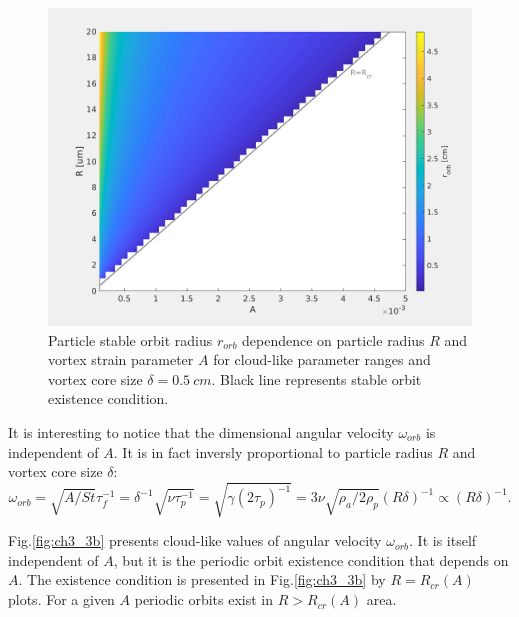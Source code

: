 \documentclass[../main.tex]{subfiles}
\begin{document}
\begin{figure}
\centering
\noindent \includegraphics[width=30pc]{gfx/orbit_vs_R_A_delta05cm.png}
\caption{Particle stable orbit radius $r_{orb}$ dependence on  particle radius $R$ and vortex strain parameter $A$ for cloud-like parameter ranges and vortex core size $\delta=0.5~cm$. Black line represents stable orbit existence condition.}
\label{fig:ch3_3a}
\end{figure}

It is interesting to notice that the dimensional angular velocity $\omega_{orb}$ is independent of $A$. It is in fact inversly proportional to particle radius $R$ and vortex core size $\delta$:
\begin{equation}
\omega_{orb}=\sqrt{A/St} \tau_f^{-1}=\delta^{-1} \sqrt{\nu \tau_p^{-1}}=\sqrt{\gamma(2\tau_p)^{-1}}=3 \nu \sqrt{\rho_a /2 \rho_p} (R \delta)^{-1} \propto (R \delta)^{-1}.
\label{ch3:eq20}
\end{equation}

Fig.\ref{fig:ch3_3b} presents cloud-like values of angular velocity $\omega_{orb}$. It is itself independent of $A$, but it is the periodic orbit existence condition that depends on $A$. The existence condition is presented in Fig.\ref{fig:ch3_3b} by  $R=R_{cr}(A)$ plots. For a given $A$ periodic orbits exist in  $R>R_{cr}(A)$ area.
\end{document}
